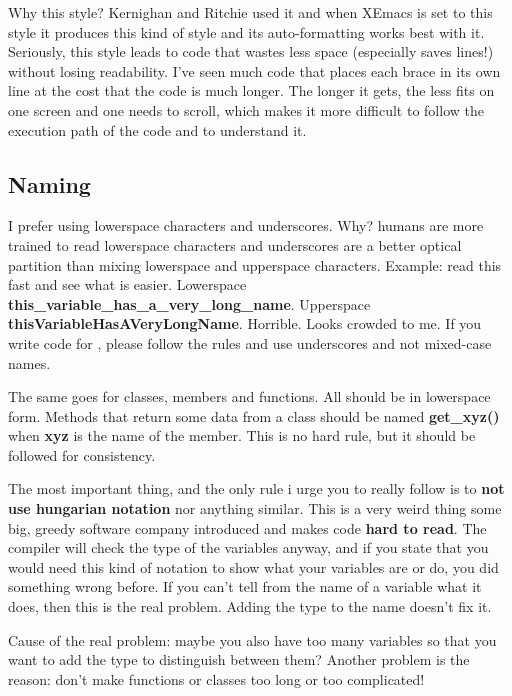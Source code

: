 \documentclass{report}
\begin{document}
    Why this style? Kernighan and Ritchie used it and when XEmacs is set
    to this style it produces this kind of style and its auto-formatting
    works best with it. Seriously, this style leads to code that wastes
    less space (especially saves lines!) without losing readability.
    I've seen much code that places each brace in its own line at the
    cost that the code is much longer. The longer it gets, the less fits
    on one screen and one needs to scroll, which makes it more difficult
    to follow the execution path of the code and to understand it.
    

    \subsection{Naming}

    I prefer using lowerspace characters and underscores. Why? humans
    are more trained to read lowerspace characters and underscores are a
    better optical partition than mixing lowerspace and upperspace
    characters. Example: read this fast and see what is easier.
    Lowerspace \textbf{this\_variable\_has\_a\_very\_long\_name}.
    Upperspace \textbf{thisVariableHasAVeryLongName}. Horrible. Looks
    crowded to me. If you write code for \dftd, please follow the rules
    and use underscores and not mixed-case names.
    
    The same goes for classes, members and functions. All should be in
    lowerspace form. Methods that return some data from a class should
    be named \textbf{get\_xyz()} when \textbf{xyz} is the name of the
    member. This is no hard rule, but it should be followed for
    consistency.
    
    The most important thing, and the only rule i urge you to really
    follow is to \textbf{not use hungarian notation} nor anything
    similar. This is a very weird thing some big, greedy software
    company introduced and makes code \textbf{hard to read}. The
    compiler will check the type of the variables anyway, and if you
    state that you would need this kind of notation to show what your
    variables are or do, you did something wrong before. If you can't
    tell from the name of a variable what it does, then this is the real
    problem. Adding the type to the name doesn't fix it.

    Cause of the real problem: maybe you also have too many variables so
    that you want to add the type to distinguish between them? Another
    problem is the reason: don't make functions or classes too long or
    too complicated!
    
\end{document}
